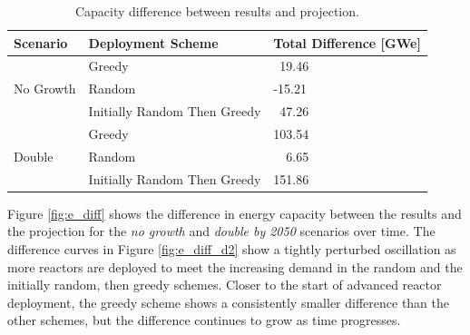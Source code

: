 \begin{table}[H]
    \centering
    \caption{Capacity difference between results and projection.}
    \label{tab:cap_diff}
    \begin{tabular}{l l l}
        \hline
        \textbf{Scenario} & \textbf{Deployment Scheme} & \textbf{Total Difference [GWe]}\\
        \hline
        \multirow{3}{*}{No Growth} & Greedy & \textcolor{white}{0}19.46 \\
        & Random & -15.21 \\
        & Initially Random Then Greedy & \textcolor{white}{0}47.26 \\
        \hline
        \multirow{3}{*}{Double} & Greedy & 103.54 \\
        & Random & \textcolor{white}{00}6.65 \\
        & Initially Random Then Greedy & 151.86 \\
        \hline
    \end{tabular}
\end{table}

Figure \ref{fig:e_diff} shows the difference in energy capacity between the results and the projection for the \textit{no growth} and \textit{double by 2050} scenarios over time. The difference curves in Figure \ref{fig:e_diff_d2} show a tightly perturbed oscillation as more reactors are deployed to meet the increasing demand in the random and the initially random, then greedy schemes. Closer to the start of advanced reactor deployment, the greedy scheme shows a consistently smaller difference than the other schemes, but the difference continues to grow as time progresses.

